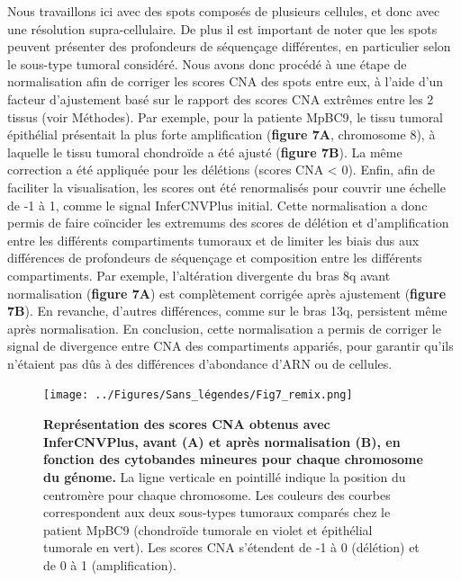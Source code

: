 \documentclass[11pt]{article}
\begin{document}
Nous travaillons ici avec des spots composés de plusieurs cellules, et donc avec une résolution supra-cellulaire. De plus il est important de noter que les spots peuvent présenter des profondeurs de séquençage différentes, en particulier selon le sous-type tumoral considéré. Nous avons donc procédé à une étape de normalisation afin de corriger les scores CNA des spots entre eux, à l’aide d’un facteur d’ajustement basé sur le rapport des scores CNA extrêmes entre les 2 tissus (voir Méthodes). Par exemple, pour la patiente MpBC9, le tissu tumoral épithélial présentait la plus forte amplification (\textbf{figure 7A}, chromosome 8), à laquelle le tissu tumoral chondroïde a été ajusté (\textbf{figure 7B}). La même correction a été appliquée pour les délétions (scores CNA < 0). Enfin, afin de faciliter la visualisation, les scores ont été renormalisés pour couvrir une échelle de -1 à 1, comme le signal InferCNVPlus initial. Cette normalisation a donc permis de faire coïncider les extremums des scores de délétion et d’amplification entre les différents compartiments tumoraux et de limiter les biais dus aux différences de profondeurs de séquençage et composition entre les différents compartiments. Par exemple, l’altération divergente du bras 8q avant normalisation (\textbf{figure 7A}) est complètement corrigée après ajustement (\textbf{figure 7B}). En revanche, d’autres différences, comme sur le bras 13q, persistent même après normalisation. En conclusion, cette normalisation a permis de corriger le signal de divergence entre CNA des compartiments appariés, pour garantir qu’ils n’étaient pas dûs à des différences d’abondance d’ARN ou de cellules.

\begin{figure}[H]
    \centering
    \texttt{[image: ../Figures/Sans\_légendes/Fig7\_remix.png]}
    \caption[\textbf{Figure 7 : Représentation des scores CNA obtenus avec InferCNVPlus, avant \textbf{(A)} et après normalisation \textbf{(B)}, en fonction des cytobandes mineures pour chaque chromosome du génome.}]{\footnotesize \textbf{Représentation des scores CNA obtenus avec InferCNVPlus, avant \textbf{(A)} et après normalisation \textbf{(B)}, en fonction des cytobandes mineures pour chaque chromosome du génome.} La ligne verticale en pointillé indique la position du centromère pour chaque chromosome. Les couleurs des courbes correspondent aux deux sous-types tumoraux comparés chez le patient MpBC9 (chondroïde tumorale en violet et épithélial tumorale en vert). Les scores CNA s’étendent de -1 à 0 (délétion) et de 0 à 1 (amplification).}
    \label{fig:fig7}
\end{figure}
\end{document}
